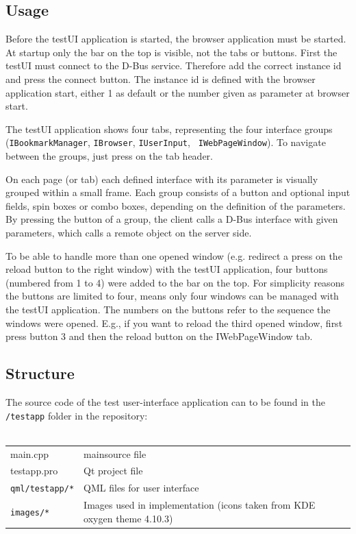 \documentclass{pelagicore}
\begin{document}
\subsection{Usage}
Before the testUI application is started, the browser application must be
started. At startup only the bar on the top is visible, not the tabs or
buttons. First the testUI must connect to the D-Bus service. Therefore add the
correct instance id and press the connect button. The instance id is defined
with the browser application start, either 1 as default or the number given as
parameter at browser start.

The testUI application shows four tabs, representing the four interface groups
({\tt IBook\-mark\-Manager}, {\tt IBrowser}, {\tt IUserInput}, {\tt
IWebPageWindow}). To navigate between the groups, just press on the tab
header.

On each page (or tab) each defined interface with its parameter is visually
grouped within a small frame. Each group consists of a button and optional
input fields, spin boxes or combo boxes, depending on the definition of the
parameters. By pressing the button of a group, the client calls a D-Bus
interface with given parameters, which calls a remote object on the server
side.

To be able to handle more than one opened window (e.g. redirect a press on the
reload button to the right window) with the testUI application, four buttons
(numbered from 1 to 4) were added to the bar on the top. For simplicity reasons
the buttons are limited to four, means only four windows can be managed with
the testUI application. The numbers on the buttons refer to the sequence the
windows were opened. E.g., if you want to reload the third opened window, first
press button 3 and then the reload button on the IWebPageWindow tab.

\subsection{Structure}
The source code of the test user-interface application can to be found in the
{\tt /testapp} folder in the repository:
\\\\
\begin{tabularx}{0.9\textwidth}{l X}
    main.cpp            & mainsource file \\
    testapp.pro         & Qt project file \\
    {\tt qml/testapp/*} & QML files for user interface \\
    {\tt images/*}      & Images used in implementation (icons taken from KDE
                          oxygen theme 4.10.3)
\end{tabularx}
\\\\
\end{document}
